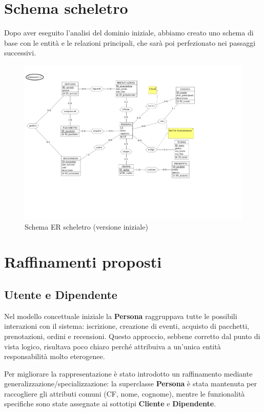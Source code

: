 \documentclass[a4paper,12pt]{report}
\begin{document}
\section{Schema scheletro}
Dopo aver eseguito l'analisi del dominio iniziale, abbiamo creato uno schema di base con le entità e le relazioni principali,
che sarà poi perfezionato nei passaggi successivi.
\begin{figure}[H]
	\centering
	\includegraphics[width=\textwidth, trim=0 100pt 150pt 0 , clip]{./pdf/scheletro.pdf}
	\caption{Schema ER scheletro (versione iniziale)}
	\label{fig:schema-scheletro}
\end{figure}

\section{Raffinamenti proposti}
\subsection{Utente e Dipendente}
Nel modello concettuale iniziale la \textbf{Persona} raggruppava tutte le possibili interazioni con il sistema: iscrizione, creazione
di eventi, acquisto di pacchetti, prenotazioni, ordini e recensioni. Questo approccio, sebbene corretto dal punto di vista logico, risultava poco chiaro
perché attribuiva a un'unica entità responsabilità molto eterogenee.

\vspace{\baselineskip}
Per migliorare la rappresentazione è stato introdotto un raffinamento mediante generalizzazione/specializzazione: la superclasse
\textbf{Persona} è stata mantenuta per raccogliere gli attributi comuni (CF, nome, cognome), mentre le funzionalità specifiche sono state assegnate
ai sottotipi \textbf{Cliente} e \textbf{Dipendente}.
\end{document}
